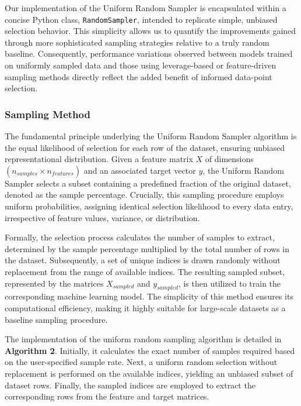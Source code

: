 \documentclass{article}
\theoremstyle{plain}
\theoremstyle{definition}
\theoremstyle{remark}
\begin{document}
Our implementation of the Uniform Random Sampler is encapsulated within a concise Python class, \texttt{RandomSampler}, intended to replicate simple, unbiased selection behavior. This simplicity allows us to quantify the improvements gained through more sophisticated sampling strategies relative to a truly random baseline. Consequently, performance variations observed between models trained on uniformly sampled data and those using leverage-based or feature-driven sampling methods directly reflect the added benefit of informed data-point selection.

\subsubsection{Sampling Method}

The fundamental principle underlying the Uniform Random Sampler algorithm is the equal likelihood of selection for each row of the dataset, ensuring unbiased representational distribution. Given a feature matrix $X$ of dimensions $(n_{samples} \times n_{features})$ and an associated target vector $y$, the Uniform Random Sampler selects a subset containing a predefined fraction of the original dataset, denoted as the sample percentage. Crucially, this sampling procedure employs uniform probabilities, assigning identical selection likelihood to every data entry, irrespective of feature values, variance, or distribution.

Formally, the selection process calculates the number of samples to extract, determined by the sample percentage multiplied by the total number of rows in the dataset. Subsequently, a set of unique indices is drawn randomly without replacement from the range of available indices. The resulting sampled subset, represented by the matrices $X_{sampled}$ and $y_{sampled}$, is then utilized to train the corresponding machine learning model. The simplicity of this method ensures its computational efficiency, making it highly suitable for large-scale datasets as a baseline sampling procedure.

The implementation of the uniform random sampling algorithm is detailed in \textbf{Algorithm 2}. Initially, it calculates the exact number of samples required based on the user-specified sample rate. Next, a uniform random selection without replacement is performed on the available indices, yielding an unbiased subset of dataset rows. Finally, the sampled indices are employed to extract the corresponding rows from the feature and target matrices.
\end{document}
